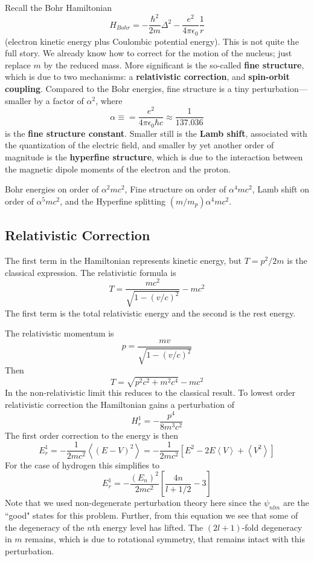 \documentclass[12pt, a4paper, oneside, openright, titlepage]{book}
\newcommand{\brkt}[1]{\left\langle #1\right\rangle}
\begin{document}
Recall the Bohr Hamiltonian \begin{equation*}
    H_{Bohr} = -\frac{\hbar^2}{2m}\Delta^2 - \frac{e^2}{4\pi\epsilon_0}\frac{1}{r}
\end{equation*}
(electron kinetic energy plus Coulombic potential energy). This is not quite the full story. We already know how to correct for the motion of the nucleus; just replace $m$ by the reduced mass. More significant is the so-called \textbf{fine structure}, which is due to two mechanisms: a \textbf{relativistic correction}, and \textbf{spin-orbit coupling}. Compared to the Bohr energies, fine structure is a tiny perturbation---smaller by a factor of $\alpha^2$, where $$\alpha \equiv = \frac{e^2}{4\pi\epsilon_0\hbar c} \approx \frac{1}{137.036}$$
is the \textbf{fine structure constant}. Smaller still is the \textbf{Lamb shift}, associated with the quantization of the electric field, and smaller by yet another order of magnitude is the \textbf{hyperfine structure}, which is due to the interaction between the magnetic dipole moments of the electron and the proton.

\begin{rmk}
    Bohr energies on order of $\alpha^2mc^2$, Fine structure on order of $\alpha^4mc^2$, Lamb shift on order of $\alpha^5mc^2$, and the Hyperfine splitting $(m/m_p)\alpha^4mc^2$.
\end{rmk}

\subsection{Relativistic Correction}

The first term in the Hamiltonian represents kinetic energy, but $T = p^2/2m$ is the classical expression. The relativistic formula is $$T = \frac{mc^2}{\sqrt{1-(v/c)^2}}-mc^2$$
The first term is the total relativistic energy and the second is the rest energy.

The relativistic momentum is $$p = \frac{mv}{\sqrt{1-(v/c)^2}}$$
Then $$T = \sqrt{p^2c^2+m^2c^4} - mc^2$$
In the non-relativistic limit this reduces to the classical result. To lowest order relativistic correction the Hamiltonian gains a perturbation of $$H^1_r = -\frac{p^4}{8m^3c^2}$$
The first order correction to the energy is then $$E_r^1 = -\frac{1}{2mc^2}\left\langle(E-V)^2\right\rangle = -\frac{1}{2mc^2}\left[E^2-2E\brkt{V}+\brkt{V^2}\right]$$
For the case of hydrogen this simplifies to $$E_r^1 = -\frac{(E_n)^2}{2mc^2}\left[\frac{4n}{l+1/2}-3\right]$$
Note that we used non-degenerate perturbation theory here since the $\psi_{nlm}$ are the ``good" states for this problem. Further, from this equation we see that some of the degeneracy of the $n$th energy level has lifted. The $(2l+1)$-fold degeneracy in $m$ remains, which is due to rotational symmetry, that remains intact with this perturbation.
\end{document}
